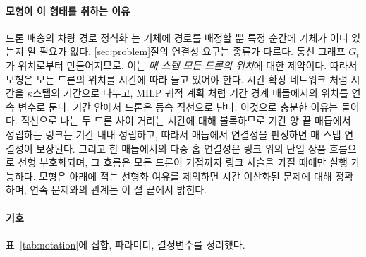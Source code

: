 \documentclass[final,5p,times,twocolumn]{elsarticle}
\begin{document}
\paragraph{모형이 이 형태를 취하는 이유}
드론 배송의 차량 경로 정식화 \cite{murray2015,agatz2018}는 기체에 경로를 배정할 뿐 특정 순간에
기체가 어디 있는지 알 필요가 없다. \ref{sec:problem}절의 연결성 요구는 종류가 다르다. 통신 그래프
$G_t$가 위치로부터 만들어지므로, 이는 \emph{매 스텝 모든 드론의 위치}에 대한 제약이다. 따라서 모형은
모든 드론의 위치를 시간에 따라 들고 있어야 한다. 시간 확장 네트워크 \cite{ford1962}처럼 시간을
$\kappa$스텝의 기간으로 나누고, MILP 궤적 계획 \cite{richards2002,schouwenaars2001}처럼 기간 경계
매듭에서의 위치를 연속 변수로 둔다. 기간 안에서 드론은 등속 직선으로 난다. 이것으로 충분한 이유는
둘이다. 직선으로 나는 두 드론 사이 거리는 시간에 대해 볼록하므로 기간 양 끝 매듭에서 성립하는
링크는 기간 내내 성립하고, 따라서 매듭에서 연결성을 판정하면 매 스텝 연결성이 보장된다. 그리고 한
매듭에서의 다중 홉 연결성은 링크 위의 단일 상품 흐름으로 선형 부호화되며, 그 흐름은 모든 드론이
거점까지 링크 사슬을 가질 때에만 실행 가능하다. 모형은 아래에 적는 선형화 여유를 제외하면 시간
이산화된 문제에 대해 정확하며, 연속 문제와의 관계는 이 절 끝에서 밝힌다.

\paragraph{기호}
표~\ref{tab:notation}에 집합, 파라미터, 결정변수를 정리했다.
\end{document}
